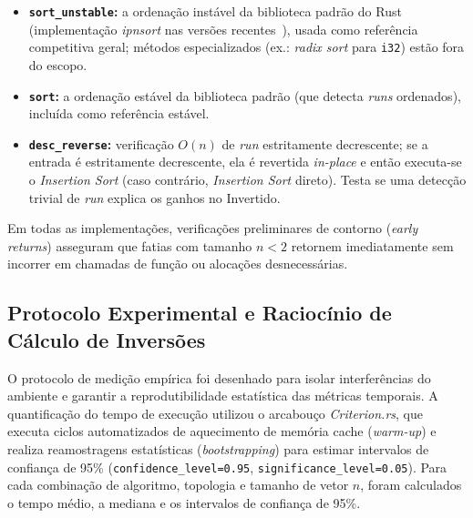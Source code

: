 \documentclass[portuguese]{sbc2025}%
\begin{document}
\begin{itemize}
    \item \textbf{\texttt{sort\_unstable}:} a ordenação instável da biblioteca padrão do Rust (implementação \emph{ipnsort} nas versões recentes~\citep{rust_std_sort_unstable}), usada como referência competitiva geral; métodos especializados (ex.: \emph{radix sort} para \texttt{i32}) estão fora do escopo.
    \item \textbf{\texttt{sort}:} a ordenação estável da biblioteca padrão (que detecta \emph{runs} ordenados), incluída como referência estável.
    \item \textbf{\texttt{desc\_reverse}:} verificação $O(n)$ de \emph{run} estritamente decrescente; se a entrada é estritamente decrescente, ela é revertida \emph{in-place} e então executa-se o \emph{Insertion Sort} (caso contrário, \emph{Insertion Sort} direto). Testa se uma detecção trivial de \emph{run} explica os ganhos no Invertido.
\end{itemize}

Em todas as implementações, verificações preliminares de contorno (\emph{early returns}) asseguram que fatias com tamanho $n < 2$ retornem imediatamente sem incorrer em chamadas de função ou alocações desnecessárias.

\subsection{Protocolo Experimental e Raciocínio de Cálculo de Inversões}

O protocolo de medição empírica foi desenhado para isolar interferências do ambiente e garantir a reprodutibilidade estatística das métricas temporais. A quantificação do tempo de execução utilizou o arcabouço \emph{Criterion.rs}, que executa ciclos automatizados de aquecimento de memória cache (\emph{warm-up}) e realiza reamostragens estatísticas (\emph{bootstrapping}) para estimar intervalos de confiança de 95\% (\texttt{confidence\_level=0.95}, \texttt{significance\_level=0.05}). Para cada combinação de algoritmo, topologia e tamanho de vetor $n$, foram calculados o tempo médio, a mediana e os intervalos de confiança de 95\%.
\end{document}
